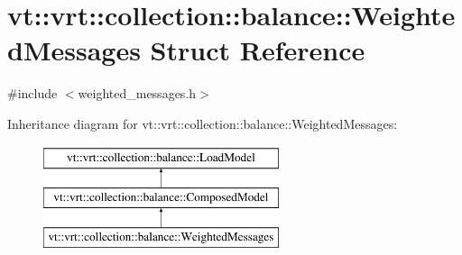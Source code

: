 \hypertarget{structvt_1_1vrt_1_1collection_1_1balance_1_1_weighted_messages}{}\section{vt\+:\+:vrt\+:\+:collection\+:\+:balance\+:\+:Weighted\+Messages Struct Reference}
\label{structvt_1_1vrt_1_1collection_1_1balance_1_1_weighted_messages}


{\ttfamily \#include $<$weighted\+\_\+messages.\+h$>$}

Inheritance diagram for vt\+:\+:vrt\+:\+:collection\+:\+:balance\+:\+:Weighted\+Messages\+:\begin{figure}[H]
\begin{center}
\leavevmode
\includegraphics[height=3.000000cm]{structvt_1_1vrt_1_1collection_1_1balance_1_1_weighted_messages}
\end{center}
\end{figure}
